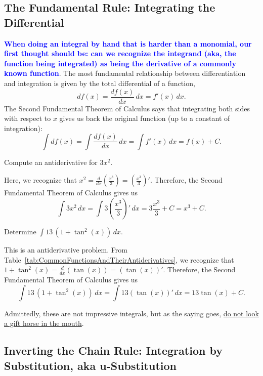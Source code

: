 \subsection{The Fundamental Rule: Integrating the Differential}
\textcolor{blue}{\bf When doing an integral by hand that is harder than a monomial, our first thought should be: can we recognize the integrand (aka, the function being integrated) as being the derivative of a commonly known function}. The most fundamental relationship between differentiation and integration is given by the total differential of a function, 
\[ df(x) = \frac{df(x)}{dx} \, dx = f'(x)\, dx. \]
The Second Fundamental Theorem of Calculus says that integrating both sides with respect to \( x \) gives us back the original function (up to a constant of integration):
\begin{equation}
\label{eq:FundamentalRule4Integration}
    \int df(x) = \int \frac{df(x)}{dx} \, dx = \int f'(x) \, dx =f(x) + C.
\end{equation} 

\bigskip

\begin{example}
Compute an antiderivative for  $3x^2$.
\end{example}
\solution Here, we recognize that \( x^2 = \frac{d}{dx}\left( \frac{x^3}{3} \right) = \left( \frac{x^3}{3} \right)'\). Therefore, the Second Fundamental Theorem of Calculus gives us
\[ \int 3x^2 \, dx = \int 3 \left( \frac{x^3}{3} \right)' \, dx = 3 \frac{x^3}{3} + C = x^3 + C. \]
\Qed

\bigskip

\begin{example}
Determine \( \int 13\, ( 1 + \tan^2(x)) \, dx \). 
\end{example}
\solution This is an antiderivative problem. From Table~\ref{tab:CommonFunctionsAndTheirAntiderivatives}, we recognize that \(  1 + \tan^2(x) = \frac{d}{dx}\left( \tan(x) \right) = \left(\tan(x) \right)'\). Therefore, the Second Fundamental Theorem of Calculus gives us
\[ \int 13\, ( 1 + \tan^2(x))  \, dx = \int 13 \left(\tan(x) \right)' \, dx = 13 \tan(x) + C. \]
\Qed

\bigskip

Admittedly, these are not impressive integrals, but as the saying goes, \href{https://www.merriam-webster.com/dictionary/look%20a%20gift%20horse%20in%20the%20mouth}{do not look a gift horse in the mouth}.

\subsection{Inverting the Chain Rule: Integration by Substitution, aka u-Substitution}

